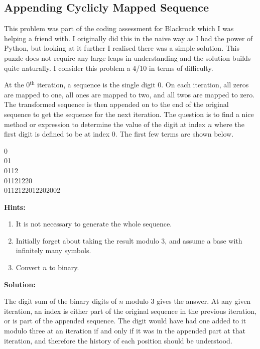 \subsection{Appending Cyclicly Mapped Sequence}

This problem was part of the coding assessment for Blackrock which I was helping a friend with. I originally did this in the naive way as I had the power of Python, but looking at it further I realised there was a simple solution. This puzzle does not require any large leaps in understanding and the solution builds quite naturally. I consider this problem a 4/10 in terms of difficulty.

At the 0$^\text{th}$ iteration, a sequence is the single digit 0. On each iteration, all zeros are mapped to one, all ones are mapped to two, and all twos are mapped to zero. The transformed sequence is then appended on to the end of the original sequence to get the sequence for the next iteration. The question is to find a nice method or expression to determine the value of the digit at index $n$ where the first digit is defined to be at index 0. The first few terms are shown below.

\begin{center}
    0  \\
    01  \\
    0112  \\
    01121220  \\
    0112122012202002
\end{center}

\textbf{Hints:}

\begin{enumerate}
    \item It is not necessary to generate the whole sequence.
    \item Initially forget about taking the result modulo 3, and assume a base with infinitely many symbols.
    \item Convert $n$ to binary.
\end{enumerate}

\textbf{Solution:}

The digit sum of the binary digits of $n$ modulo 3 gives the answer. At any given iteration, an index is either part of the original sequence in the previous iteration, or is part of the appended sequence. The digit would have had one added to it modulo three at an iteration if and only if it was in the appended part at that iteration, and therefore the history of each position should be understood.

